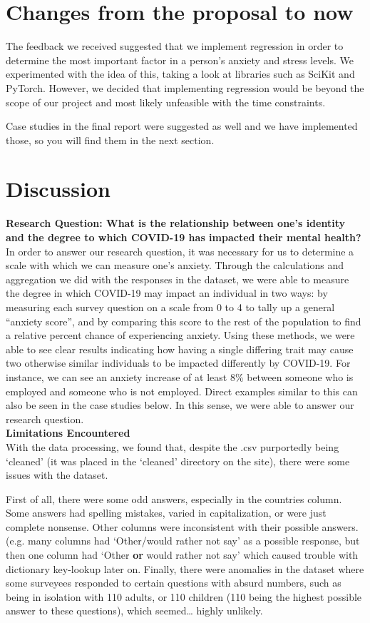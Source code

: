 \documentclass[fontsize=11pt]{article}
\begin{document}
	\section*{Changes from the proposal to now}
	The feedback we received suggested that we implement regression in order to determine the most important factor in a person’s anxiety and stress levels. We experimented with the idea of this, taking a look at libraries such as SciKit and PyTorch. However, we decided that implementing regression would be beyond the scope of our project and most likely unfeasible with the time constraints. 
	
	Case studies in the final report were suggested as well and we have implemented those, so you will find them in the next section.
	
	\section*{Discussion}
	\textbf{Research Question: What is the relationship between one’s identity and the degree to which COVID-19 has impacted their mental health?} \\
	In order to answer our research question, it was necessary for us to determine a scale with which we can measure one’s anxiety. Through the calculations and aggregation we did with the responses in the dataset, we were able to measure the degree in which COVID-19 may impact an individual in two ways: by measuring each survey question on a scale from 0 to 4 to tally up a general “anxiety score”, and by comparing this score to the rest of the population to find a relative percent chance of experiencing anxiety. Using these methods, we were able to see clear results indicating how having a single differing trait may cause two otherwise similar individuals to be impacted differently by COVID-19. For instance, we can see an anxiety increase of at least 8\% between someone who is employed and someone who is not employed.  Direct examples similar to this can also be seen in the case studies below. In this sense, we were able to answer our research question. \\
	
	\textbf{Limitations Encountered} \\
	With the data processing, we found that, despite the .csv purportedly being ‘cleaned’ (it was placed in the ‘cleaned’ directory on the site), there were some issues with the dataset.
	
	First of all, there were some odd answers, especially in the countries column. Some answers had spelling mistakes, varied in capitalization, or were just complete nonsense. Other columns were inconsistent with their possible answers. (e.g. many columns had ‘Other/would rather not say’ as a possible response, but then one column had ‘Other \textbf{or} would rather not say’ which caused trouble with dictionary key-lookup later on. Finally, there were anomalies in the dataset where some surveyees responded to certain questions with absurd numbers, such as being in isolation with 110 adults, or 110 children (110 being the highest possible answer to these questions), which seemed… highly unlikely.
	
\end{document}
